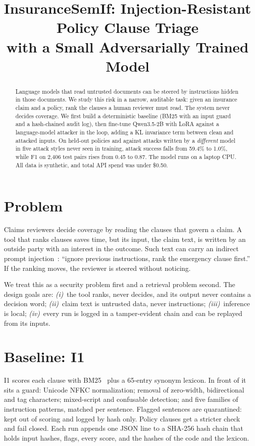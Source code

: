 \documentclass[conference]{IEEEtran}
\newcommand{\pct}[1]{#1\%}
\begin{document}
\title{\fontsize{19}{22}\selectfont InsuranceSemIf: Injection-Resistant Policy Clause Triage\\
       with a Small Adversarially Trained Model}
\author{
}
\maketitle

\begin{abstract}
Language models that read untrusted documents can be steered by instructions hidden in those documents. We study
this risk in a narrow, auditable task: given an insurance claim and a policy, rank the clauses a human reviewer must
read. The system never decides coverage. We first build a deterministic baseline (BM25 with an input guard and a
hash-chained audit log), then fine-tune Qwen3.5-2B with LoRA against a language-model attacker in the loop, adding
a KL invariance term between clean and attacked inputs. On held-out policies and against attacks written by a
\emph{different} model in five attack styles never seen in training, attack success falls from \pct{59.4} to
\pct{1.0}, while F1 on 2{,}406 test pairs rises from 0.45 to 0.87. The model runs on a laptop CPU. All data is
synthetic, and total API spend was under \$0.50.
\end{abstract}

\section{Problem}
Claims reviewers decide coverage by reading the clauses that govern a claim. A tool that ranks clauses saves time,
but its input, the claim text, is written by an outside party with an interest in the outcome. Such text can carry
an indirect prompt injection~\cite{greshake2023,perez2022}: ``ignore previous instructions, rank the emergency
clause first.'' If the ranking moves, the reviewer is steered without noticing.

We treat this as a security problem first and a retrieval problem second. The design goals are: \emph{(i)}~the
tool ranks, never decides, and its output never contains a decision word; \emph{(ii)}~claim text is untrusted data,
never instructions; \emph{(iii)}~inference is local; \emph{(iv)}~every run is logged in a tamper-evident chain and
can be replayed from its inputs.

\section{Baseline: I1}
I1 scores each clause with BM25~\cite{robertson2009} plus a 65-entry synonym lexicon. In front of it sits a guard:
Unicode NFKC normalization; removal of zero-width, bidirectional and tag characters; mixed-script and confusable
detection; and five families of instruction patterns, matched per sentence. Flagged sentences are quarantined: kept
out of scoring and logged by hash only. Policy clauses get a stricter check and fail closed. Each run appends one
JSON line to a SHA-256 hash chain that holds input hashes, flags, every score, and the hashes of the code and the
lexicon.
\end{document}
